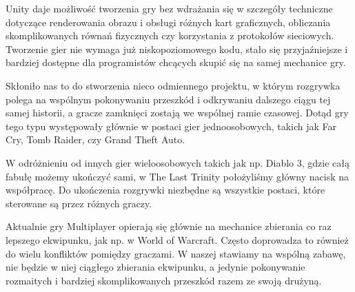 Unity daje możliwość tworzenia gry bez wdrażania się w szczegóły techniczne dotyczące renderowania obrazu i obsługi różnych kart graficznych, obliczania skomplikowanych równań fizycznych czy korzystania z protokołów sieciowych. Tworzenie gier nie wymaga już niskopoziomowego kodu, stało się przyjaźniejsze i bardziej dostępne dla programistów chcących skupić się na samej mechanice gry.

Skłoniło nas to do stworzenia nieco odmiennego projektu, w którym rozgrywka polega na wspólnym pokonywaniu przeszkód i odkrywaniu dalszego ciągu tej samej historii, a gracze zamknięci zostają we wspólnej ramie czasowej. Dotąd gry tego typu występowały głównie w postaci gier jednoosobowych, takich jak Far Cry, Tomb Raider, czy Grand Theft Auto.

W odróżnieniu od innych gier wieloosobowych takich jak np. Diablo 3, gdzie całą fabułę możemy ukończyć sami, w The Last Trinity położyliśmy główny nacisk na współpracę. Do ukończenia rozgrywki niezbędne są wszystkie postaci, które sterowane są przez różnych graczy.

Aktualnie gry Multiplayer opierają się głównie na mechanice zbierania co raz lepszego ekwipunku, jak np. w World of Warcraft. Często doprowadza to również do wielu konfliktów pomiędzy graczami. W naszej stawiamy na wspólną zabawę, nie będzie w niej ciągłego zbierania ekwipunku, a jedynie pokonywanie rozmaitych i bardziej skomplikowanych przeszkód razem ze swoją drużyną.

